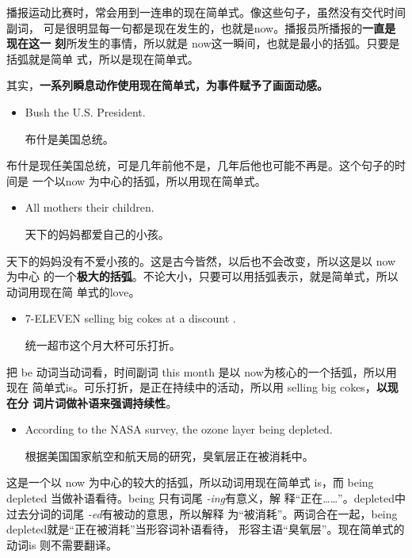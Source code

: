 播报运动比赛时，常会用到一连串的现在简单式。像这些句子，虽然没有交代时间副词，
可是很明显每一句都是现在发生的，也就是now。播报员所播报的\textbf{一直是现在这一
  刻}所发生的事情，所以就是 now这一瞬间，也就是最小的括弧。只要是括弧就是简单
式，所以是现在简单式。

其实，\textbf{一系列瞬息动作使用现在简单式，为事件赋予了画面动感。}

\begin{itemize}
\item  Bush  the U.S. President.

  布什是美国总统。
\end{itemize}

布什是现任美国总统，可是几年前他不是，几年后他也可能不再是。这个句子的时间是
一个以now 为中心的括弧，所以用现在简单式。

\begin{itemize}
\item  All mothers  their children.

  天下的妈妈都爱自己的小孩。
\end{itemize}

天下的妈妈没有不爱小孩的。这是古今皆然，以后也不会改变，所以这是以 now为中心
的一个\textbf{极大的括弧}。不论大小，只要可以用括弧表示，就是简单式，所以动词用现在简
单式的love。

\begin{itemize}
\item  7-ELEVEN  selling big cokes at a discount .

  统一超市这个月大杯可乐打折。
\end{itemize}

把 be 动词当动词看，时间副词 this month 是以 now为核心的一个括弧，所以用现在
简单式is。可乐打折，是正在持续中的活动，所以用 selling big cokes，\textbf{以现在分
  词片词做补语来强调持续性}。

\begin{itemize}
\item According to the NASA survey, the ozone layer  being depleted.

  根据美国国家航空和航天局的研究，臭氧层正在被消耗中。
\end{itemize}

这是一个以 now 为中心的较大的括弧，所以动词用现在简单式 is，而 being
depleted 当做补语看待。being 只有词尾 \emph{-ing}有意义，解
释“正在……”。depleted中过去分词的词尾 \emph{-ed}有被动的意思，所以解释
为“被消耗”。两词合在一起，being depleted就是“正在被消耗”当形容词补语看待，
形容主语“臭氧层”。现在简单式的动词is 则不需要翻译。

